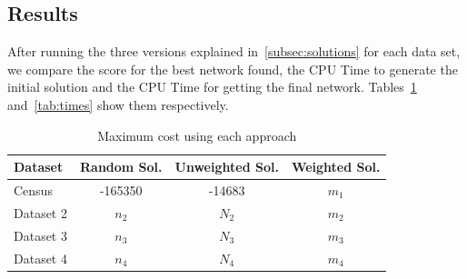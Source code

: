 \subsection{Results}
\label{subsec:results}
	After running the three versions explained in~\ref{subsec:solutions} for each data set, we compare the score for the best network found, the CPU Time to generate the initial solution and the CPU Time for getting the final network. Tables~\ref{tab:costs} and~\ref{tab:times} show them respectively.
	\begin{table}[ h ]
		\centering
		\begin{tabular}{ | l | c | c | c | }
			\hline
			Dataset & Random Sol. & Unweighted Sol. & Weighted Sol.\\ \hline
			Census & -165350 & -14683 & $m_1$ \\ \hline
			Dataset 2 & $n_2$ & $N_2$ & $m_2$ \\ \hline
			Dataset 3 & $n_3$ & $N_3$ & $m_3$ \\ \hline
			Dataset 4 & $n_4$ & $N_4$ & $m_4$ \\ \hline
		\end{tabular}
		\caption{Maximum cost using each approach}
		\label{tab:costs}
	\end{table}
	
